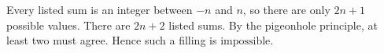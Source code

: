 Every listed sum is an integer between $-n$ and $n$, so there are only $2n+1$ possible values. There are $2n+2$ listed sums. By the pigeonhole principle, at least two must agree. Hence such a filling is $\boxed{\text{impossible}}$.
